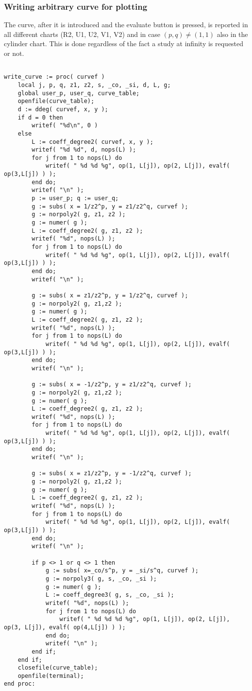 \documentclass[a4paper,10pt]{article}
\begin{document}
\subsubsection{Writing arbitrary curve for plotting}

The curve, after it is introduced and the evaluate button is pressed, is reported in all different charts (R2, U1, U2, V1, V2) and in case $(p,q)\not=(1,1)$ also in the cylinder chart.  This is done regardless of the fact a study at infinity is requested or not.

\begin{lstlisting}[name=writelog2]

write_curve := proc( curvef )
    local j, p, q, z1, z2, s, _co, _si, d, L, g;
    global user_p, user_q, curve_table;
    openfile(curve_table);        
    d := ddeg( curvef, x, y );
    if d = 0 then
        writef( "%d\n", 0 )
    else
        L := coeff_degree2( curvef, x, y );
        writef( "%d %d", d, nops(L) );
        for j from 1 to nops(L) do
            writef( " %d %d %g", op(1, L[j]), op(2, L[j]), evalf( op(3,L[j]) ) );
        end do;
        writef( "\n" );
        p := user_p; q := user_q;
        g := subs( x = 1/z2^p, y = z1/z2^q, curvef );
        g := norpoly2( g, z1, z2 );
        g := numer( g );
        L := coeff_degree2( g, z1, z2 );
        writef( "%d", nops(L) );
        for j from 1 to nops(L) do
            writef( " %d %d %g", op(1, L[j]), op(2, L[j]), evalf( op(3,L[j]) ) );
        end do;
        writef( "\n" );

        g := subs( x = z1/z2^p, y = 1/z2^q, curvef );
        g := norpoly2( g, z1,z2 );
        g := numer( g );
        L := coeff_degree2( g, z1, z2 );
        writef( "%d", nops(L) );
        for j from 1 to nops(L) do
            writef( " %d %d %g", op(1, L[j]), op(2, L[j]), evalf( op(3,L[j]) ) );
        end do;
        writef( "\n" );

        g := subs( x = -1/z2^p, y = z1/z2^q, curvef );
        g := norpoly2( g, z1,z2 );
        g := numer( g );
        L := coeff_degree2( g, z1, z2 );
        writef( "%d", nops(L) );
        for j from 1 to nops(L) do
            writef( " %d %d %g", op(1, L[j]), op(2, L[j]), evalf( op(3,L[j]) ) );
        end do;
        writef( "\n" );

        g := subs( x = z1/z2^p, y = -1/z2^q, curvef );
        g := norpoly2( g, z1,z2 );
        g := numer( g );
        L := coeff_degree2( g, z1, z2 );
        writef( "%d", nops(L) );
        for j from 1 to nops(L) do
            writef( " %d %d %g", op(1, L[j]), op(2, L[j]), evalf( op(3,L[j]) ) );
        end do;
        writef( "\n" );

        if p <> 1 or q <> 1 then
            g := subs( x=_co/s^p, y = _si/s^q, curvef );
            g := norpoly3( g, s, _co, _si );
            g := numer( g );
            L := coeff_degree3( g, s, _co, _si );
            writef( "%d", nops(L) );
            for j from 1 to nops(L) do
                writef( " %d %d %d %g", op(1, L[j]), op(2, L[j]), op(3, L[j]), evalf( op(4,L[j]) ) );
            end do;
            writef( "\n" );
        end if;
    end if;
    closefile(curve_table);
    openfile(terminal);
end proc:
\end{lstlisting}
\end{document}
